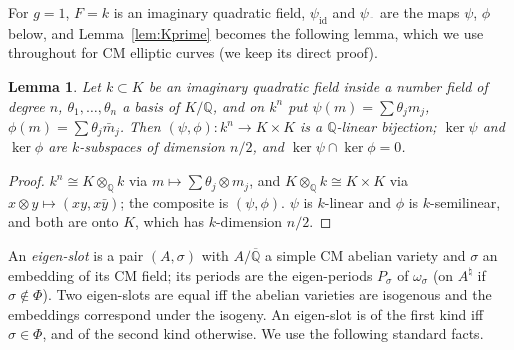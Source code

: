 \documentclass[11pt]{amsart}
\newtheorem{lemma}[theorem]{Lemma}
\theoremstyle{definition}
\newcommand{\Qb}{\overline{\mathbb{Q}}}
\newcommand{\Q}{\mathbb{Q}}
\begin{document}
\noindent For $g=1$, $F=k$ is an imaginary quadratic field, $\psi_{\mathrm{id}}$ and $\psi_{\overline{\phantom{x}}}$ are the
maps $\psi$, $\phi$ below, and Lemma~\ref{lem:Kprime} becomes the following lemma, which we use throughout for CM elliptic
curves (we keep its direct proof).

\begin{lemma}\label{lem:K}
Let $k\subset K$ be an imaginary quadratic field inside a number field of degree $n$, $\theta_1,\dots,\theta_n$ a basis of
$K/\Q$, and on $k^n$ put $\psi(m)=\sum\theta_jm_j$, $\phi(m)=\sum\theta_j\bar m_j$. Then $(\psi,\phi)\colon k^n\to K\times K$
is a $\Q$-linear bijection; $\ker\psi$ and $\ker\phi$ are $k$-subspaces of dimension $n/2$, and $\ker\psi\cap\ker\phi=0$.
\end{lemma}

\begin{proof}
$k^n\cong K\otimes_\Q k$ via $m\mapsto\sum\theta_j\otimes m_j$, and $K\otimes_\Q k\cong K\times K$ via
$x\otimes y\mapsto(xy,x\bar y)$; the composite is $(\psi,\phi)$. $\psi$ is $k$-linear and $\phi$ is $k$-semilinear, and
both are onto $K$, which has $k$-dimension $n/2$.
\end{proof}
\noindent An \emph{eigen-slot} is a pair $(A,\sigma)$ with $A/\Qb$ a simple CM abelian variety and $\sigma$ an embedding
of its CM field; its periods are the eigen-periods $P_\sigma$ of $\omega_\sigma$ (on $A^\natural$ if $\sigma\notin\Phi$). Two
eigen-slots are equal iff the abelian varieties are isogenous and the embeddings correspond under the isogeny. An
eigen-slot is of the first kind iff $\sigma\in\Phi$, and of the second kind otherwise. We use the following standard
facts.
\end{document}
